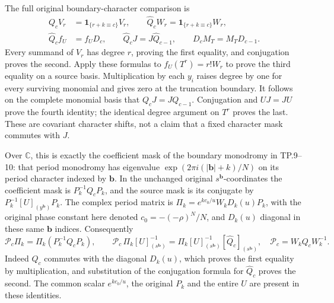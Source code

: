 The full original boundary-character comparison is
\[
 \begin{split}
 Q_c V_r&=\mathbf 1_{\{r+k\equiv c\}}V_r,\qquad
 \widehat Q_c W_r=\mathbf 1_{\{r+k\equiv c\}}W_r,\\
 \widehat Q_c f_U&=f_U D_c,\qquad
 \widehat Q_c J=J\widehat Q_{c-1},\qquad
 D_c M_T=M_TD_{c-1}.
 \end{split}
 \tag{TCL.30}\label{eq:tcl-character-diagram}
\]
Every summand of \(V_r\) has degree \(r\), proving the first
equality, and conjugation proves the second. Apply these formulas
to \(f_U(T^r)=r!W_r\) to prove the third equality on a source
basis. Multiplication by each \(y_i\) raises degree by one for
every surviving monomial and gives zero at the truncation boundary.
It follows on the complete monomial basis that
\(Q_cJ=JQ_{c-1}\). Conjugation and \(UJ=JU\) prove the fourth
identity; the identical degree argument on \(T^r\) proves the
last. These are covariant character shifts, not a claim that a
fixed character mask commutes with \(J\).

Over \(\mathbb C\), this is exactly the coefficient mask of
the boundary monodromy in TP.9--10: that period monodromy has
eigenvalue \(\exp(2\pi i(|\mathbf b|+k)/N)\) on its period
character indexed by \(\mathbf b\). In the unchanged original
\(s^{\mathbf b}\)-coordinates the coefficient mask is
\(P_k^{-1}Q_cP_k\), and the source mask is its conjugate by
\(P_k^{-1}[U]_{(y^{\mathbf b})}P_k\). The complex period matrix
is \(\Pi_k=e^{kc_0/u}W_kD_k(u)P_k\), with the original phase
constant here denoted \(c_0=-(-\rho)^N/N\), and \(D_k(u)\)
diagonal in these same \(\mathbf b\) indices. Consequently
\[
 \mathcal P_c\Pi_k=\Pi_k(P_k^{-1}Q_cP_k),\qquad
 \mathcal P_c\,\Pi_k[U]_{(s^{\mathbf b})}^{-1}
   =\Pi_k[U]_{(s^{\mathbf b})}^{-1}
                [\widehat Q_c]_{(s^{\mathbf b})},
 \quad \mathcal P_c=W_kQ_cW_k^{-1}.
 \tag{TCL.31}\label{eq:tcl-period-mask}
\]
Indeed \(Q_c\) commutes with the diagonal \(D_k(u)\), which
proves the first equality by multiplication, and substitution of
the conjugation formula for \(\widehat Q_c\) proves the second.
The common scalar \(e^{kc_0/u}\), the original \(P_k\) and the
entire \(U\) are present in these identities.

